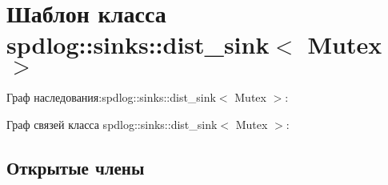 \hypertarget{classspdlog_1_1sinks_1_1dist__sink}{}\section{Шаблон класса spdlog\+:\+:sinks\+:\+:dist\+\_\+sink$<$ Mutex $>$}
\label{classspdlog_1_1sinks_1_1dist__sink}


Граф наследования\+:spdlog\+:\+:sinks\+:\+:dist\+\_\+sink$<$ Mutex $>$\+:


Граф связей класса spdlog\+:\+:sinks\+:\+:dist\+\_\+sink$<$ Mutex $>$\+:
\subsection*{Открытые члены}
